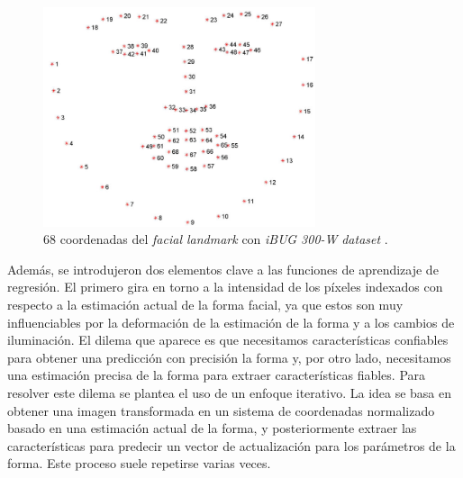 \begin{figure}[htp]
	\centering
	\includegraphics[width=8cm]{imagenes/facial_landmarks_68markup.jpg}
	\caption{68 coordenadas del \textit{facial landmark} con \textit{iBUG 300-W} \textit{dataset} \cite{ibug}.}
	\label{fig:dlibPoints}
\end{figure}

Además, se introdujeron dos elementos clave a las funciones de aprendizaje de regresión. El primero gira en torno a la intensidad de los píxeles indexados con respecto a la estimación actual de la forma facial, ya que estos son muy influenciables por la deformación de la estimación de la forma y a los cambios de iluminación. El dilema que aparece es que necesitamos características confiables para obtener una predicción con precisión la forma y, por otro lado, necesitamos una estimación precisa de la forma para extraer características fiables. Para resolver este dilema se plantea el uso de un enfoque iterativo. La idea se basa en obtener una imagen transformada en un sistema de coordenadas normalizado basado en una estimación actual de la forma, y posteriormente extraer las características para predecir un vector de actualización para los parámetros de la forma. Este proceso suele repetirse varias veces.

